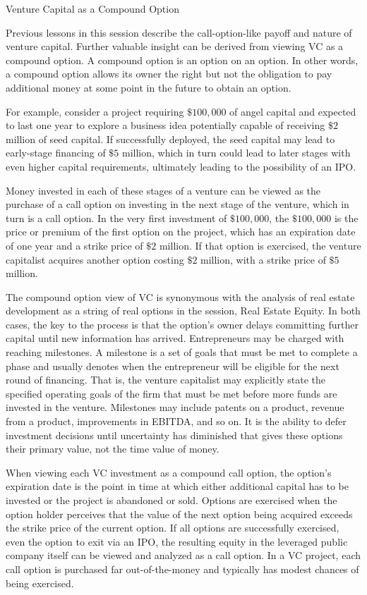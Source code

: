 \documentclass[11pt]{article}
\begin{document}
Venture Capital as a Compound Option

Previous lessons in this session describe the call-option-like payoff and nature of venture capital. Further valuable insight can be derived from viewing VC as a compound option. A compound option is an option on an option. In other words, a compound option allows its owner the right but not the obligation to pay additional money at some point in the future to obtain an option.

For example, consider a project requiring $\$ 100,000$ of angel capital and expected to last one year to explore a business idea potentially capable of receiving $\$ 2$ million of seed capital. If successfully deployed, the seed capital may lead to early-stage financing of $\$ 5$ million, which in turn could lead to later stages with even higher capital requirements, ultimately leading to the possibility of an IPO.

Money invested in each of these stages of a venture can be viewed as the purchase of a call option on investing in the next stage of the venture, which in turn is a call option. In the very first investment of $\$ 100,000$, the $\$ 100,000$ is the price or premium of the first option on the project, which has an expiration date of one year and a strike price of $\$ 2$ million. If that option is exercised, the venture capitalist acquires another option costing $\$ 2$ million, with a strike price of $\$ 5$ million.

The compound option view of VC is synonymous with the analysis of real estate development as a string of real options in the session, Real Estate Equity. In both cases, the key to the process is that the option's owner delays committing further capital until new information has arrived. Entrepreneurs may be charged with reaching milestones. A milestone is a set of goals that must be met to complete a phase and usually denotes when the entrepreneur will be eligible for the next round of financing. That is, the venture capitalist may explicitly state the specified operating goals of the firm that must be met before more funds are invested in the venture. Milestones may include patents on a product, revenue from a product, improvements in EBITDA, and so on. It is the ability to defer investment decisions until uncertainty has diminished that gives these options their primary value, not the time value of money.

When viewing each VC investment as a compound call option, the option's expiration date is the point in time at which either additional capital has to be invested or the project is abandoned or sold. Options are exercised when the option holder perceives that the value of the next option being acquired exceeds the strike price of the current option. If all options are successfully exercised, even the option to exit via an IPO, the resulting equity in the leveraged public company itself can be viewed and analyzed as a call option. In a VC project, each call option is purchased far out-of-the-money and typically has modest chances of being exercised.
\end{document}
